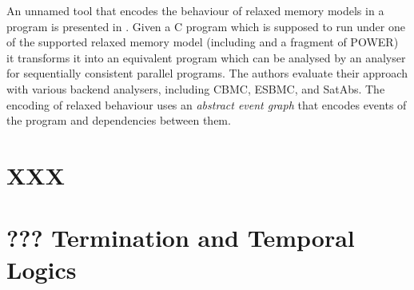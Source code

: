 An unnamed tool that encodes the behaviour of relaxed memory models in a program is presented in .
Given a C program which is supposed to run under one of the supported relaxed memory model (including \xtso and a fragment of POWER) it transforms it into an equivalent program which can be analysed by an analyser for sequentially consistent parallel programs.
The authors evaluate their approach with various backend analysers, including CBMC, ESBMC, and SatAbs.
The encoding of relaxed behaviour uses an \emph{abstract event graph} that encodes events of the program and dependencies between them.





\iffalse
\section{XXX}

\section{??? Termination and Temporal Logics}


